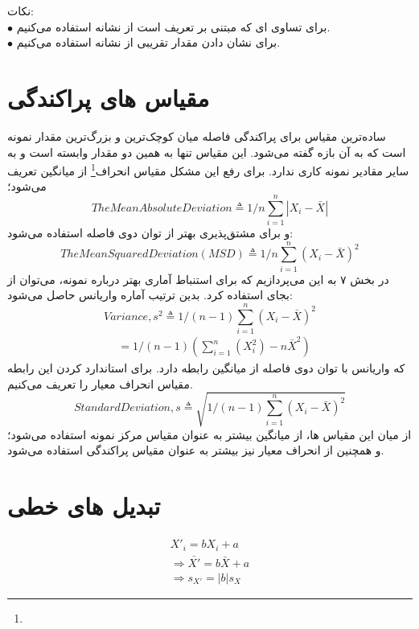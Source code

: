 \documentclass[12pt,onecolumn,a4paper]{article}
\begin{document}
نکات: \\
$\bullet$ برای تساوی ای که مبتنی بر تعریف است از نشانه \lr{$\overset{\Delta}{=}$} استفاده می‌کنیم. \\
$\bullet$ برای نشان دادن مقدار تقریبی از نشانه \lr{$\simeq$} استفاده می‌کنیم.


\section{مقیاس های پراکندگی}
ساده‌ترین مقیاس برای پراکندگی فاصله میان کوچک‌ترین و بزرگ‌ترین مقدار نمونه است که به آن بازه گفته می‌شود. این مقیاس تنها به همین دو مقدار وابسته است و به سایر مقادیر نمونه کاری ندارد.
برای رفع این مشکل مقیاس انحراف\footnote{} از میانگین تعریف می‌شود؛
\begin{equation}
    The Mean Absolute Deviation \triangleq 1/n \sum_{i=1}^{n} |X_i - \bar{X}|
\end{equation}
و برای مشتق‌پذیری بهتر از توان‌ دوی فاصله استفاده می‌شود:
\begin{equation}
    The Mean Squared Deviation(MSD) \triangleq 1/n \sum_{i=1}^{n} (X_i - \bar{X})^2
\end{equation}
در بخش ۷ به این می‌پردازیم که برای استنباط آماری بهتر درباره نمونه، می‌توان از   بجای  استفاده کرد.
بدین ترتیب آماره واریانس حاصل می‌شود:
\begin{equation}
    Variance, s^2 \triangleq 1/(n-1) \sum_{i=1}^{n} (X_i-\bar{X})^2
\end{equation}
\begin{align*}
    &= 1/(n-1) (\sum_{i=1}^{n} (X_i^2) - n\bar{X}^2)
\end{align*}
که واریانس با توان دوی فاصله از میانگین رابطه دارد. برای استاندارد کردن این رابطه مقیاس انحراف معیار را تعریف می‌کنیم.
\begin{equation}
    Standard Deviation, s \triangleq \sqrt{1/(n-1) \sum_{i=1}^{n} (X_i-\bar{X})^2 }
\end{equation}
از میان این مقیاس ها، از میانگین بیشتر به عنوان مقیاس مرکز نمونه استفاده می‌شود؛ و همچنین از انحراف معیار نیز بیشتر به عنوان مقیاس پراکندگی استفاده می‌شود.


\section{تبدیل های خطی}
\begin{align*}
    X'_i =  b X_i + a \\
    \Rightarrow \bar{X'} =  b\bar{X} + a \\
    \Rightarrow s_{X'} =  |b|s_X
\end{align*}
\end{document}
